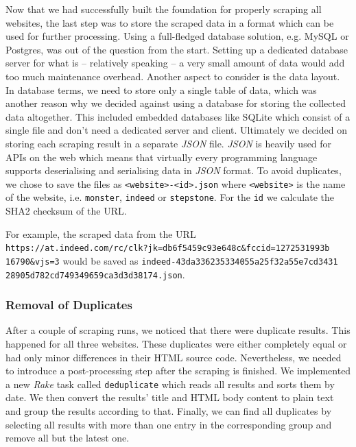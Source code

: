 \documentclass[runningheads]{llncs}
\begin{document}
Now that we had successfully built the foundation for properly scraping all websites, the last step was to store the scraped data in a format which can be used for further processing. Using a full-fledged database solution, e.g. MySQL or Postgres, was out of the question from the start. Setting up a dedicated database server for what is -- relatively speaking -- a very small amount of data would add too much maintenance overhead. Another aspect to consider is the data layout.
In database terms, we need to store only a single table of data, which was another reason why we decided against using a database for storing the collected data altogether. This included embedded databases like SQLite which consist of a single file and don't need a dedicated server and client. Ultimately we decided on storing each scraping result in a separate \textit{JSON} file. \textit{JSON} is heavily used for APIs on the web which means that virtually every programming language supports deserialising and serialising data in \textit{JSON} format. To avoid duplicates, we chose to save the files as \texttt{<website>-<id>.json} where \texttt{<website>} is the name of the website, i.e. \texttt{monster}, \texttt{indeed} or \texttt{stepstone}. For the \texttt{id} we calculate the SHA2 checksum of the URL.

For example, the scraped data from the URL \\
\texttt{https://at.indeed.com/rc/clk?jk=db6f5459c93e648c\&fccid=1272531993b\\16790\&vjs=3} would be saved as
\texttt{indeed-43da336235334055a25f32a55e7cd3431\\28905d782cd749349659ca3d3d38174.json}.

\subsubsection{Removal of Duplicates}
\label{subsub:removal_of_duplicates}

After a couple of scraping runs, we noticed that there were duplicate results. This happened for all three websites. These duplicates were either completely equal or had only minor differences in their HTML source code. Nevertheless, we needed to introduce a post-processing step after the scraping is finished. We implemented a new \textit{Rake} task called \texttt{deduplicate} which reads all results and sorts them by date. We then convert the results' title and HTML body content to plain text and group the results according to that. Finally, we can find all duplicates by selecting all results with more than one entry in the corresponding group and remove all but the latest one.
\end{document}
